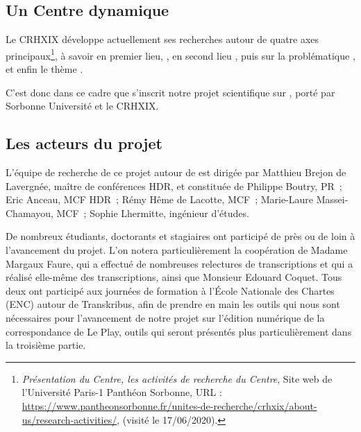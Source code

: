 \subsection{Un Centre dynamique}

Le CRHXIX développe actuellement ses recherches autour de quatre axes principaux\footnote{\emph{Présentation du Centre, les activités de recherche du Centre}, Site web de l’Université Paris-1 Panthéon Sorbonne, URL : \url{https://www.pantheonsorbonne.fr/unites-de-recherche/crhxix/about-us/research-activities/}, (visité le 17/06/2020).}, à savoir en premier lieu, , en second lieu , puis sur la problématique , et enfin le thème .	

C’est donc dans ce cadre que s’inscrit notre projet scientifique sur , porté par Sorbonne Université et le CRHXIX.

\subsection{Les acteurs du projet}

L’équipe de recherche de ce projet autour de est dirigée par Matthieu Brejon de Lavergnée, maître de conférences HDR, et constituée de Philippe Boutry, PR ; Eric Anceau, MCF HDR ; Rémy Hême de Lacotte, MCF ; Marie-Laure Massei-Chamayou, MCF ; Sophie Lhermitte, ingénieur d’études.

De nombreux étudiants, doctorants et stagiaires ont participé de près ou de loin à l’avancement du projet. L’on notera particulièrement la coopération de Madame Margaux Faure, qui a effectué de nombreuses relectures de transcriptions et qui a réalisé elle-même des transcriptions, ainsi que Monsieur Edouard Coquet. Tous deux ont participé aux journées de formation à l’École Nationale des Chartes (ENC) autour de Transkribus, afin de prendre en main les outils qui nous sont nécessaires pour l'avancement de notre projet sur l'édition numérique de la correspondance de Le Play, outils qui seront présentés plus particulièrement dans la troisième partie.

